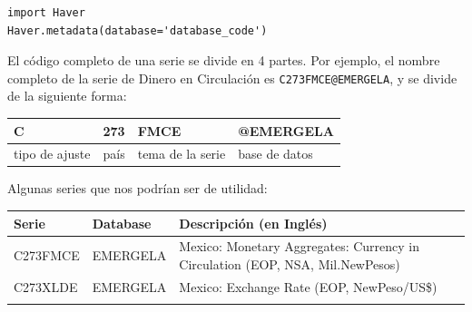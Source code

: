 \documentclass[
]{book}
\begin{document}
\begin{verbatim}
import Haver
Haver.metadata(database='database_code')
\end{verbatim}

El código completo de una serie se divide en 4 partes. Por ejemplo, el nombre completo de la serie de Dinero en Circulación es \texttt{C273FMCE@EMERGELA}, y se divide de la siguiente forma:

\begin{longtable}[]{@{}llll@{}}
\toprule
C & 273 & FMCE & @EMERGELA\tabularnewline
\midrule
\endhead
tipo de ajuste & país & tema de la serie & base de datos\tabularnewline
\bottomrule
\end{longtable}

Algunas series que nos podrían ser de utilidad:

\begin{longtable}[]{@{}lll@{}}
\toprule
\begin{minipage}[b]{0.20\columnwidth}\raggedright
Serie\strut
\end{minipage} & \begin{minipage}[b]{0.30\columnwidth}\raggedright
Database\strut
\end{minipage} & \begin{minipage}[b]{0.41\columnwidth}\raggedright
Descripción (en Inglés)\strut
\end{minipage}\tabularnewline
\midrule
\endhead
\begin{minipage}[t]{0.20\columnwidth}\raggedright
C273FMCE\strut
\end{minipage} & \begin{minipage}[t]{0.30\columnwidth}\raggedright
EMERGELA\strut
\end{minipage} & \begin{minipage}[t]{0.41\columnwidth}\raggedright
Mexico: Monetary Aggregates: Currency in Circulation (EOP, NSA, Mil.NewPesos)\strut
\end{minipage}\tabularnewline
\begin{minipage}[t]{0.20\columnwidth}\raggedright
C273XLDE\strut
\end{minipage} & \begin{minipage}[t]{0.30\columnwidth}\raggedright
EMERGELA\strut
\end{minipage} & \begin{minipage}[t]{0.41\columnwidth}\raggedright
Mexico: Exchange Rate (EOP, NewPeso/US\$)\strut
\end{minipage}\tabularnewline
\begin{minipage}[t]{0.20\columnwidth}\raggedright

\end{minipage}
\end{longtable}
\end{document}
